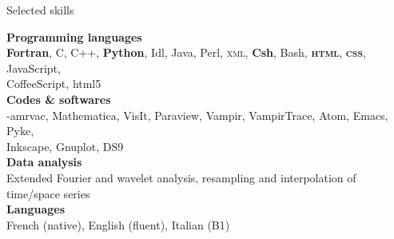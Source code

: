 \documentclass[a4paper,oneside]{cv}
\begin{document}
\begin{rubrique}{Selected skills}
~

\textbf{Programming languages}\\
\hspace*{1cm}\textbf{Fortran}, C, C++, \textbf{Python}, Idl, Java, Perl, \textsc{xml}, \textbf{Csh}, Bash, \textbf{\textsc{html}}, \textbf{\textsc{css}}, JavaScript, \\
\hspace*{1cm}CoffeeScript, {\sc html5}\\ 

\textbf{Codes \& softwares}\\
\hspace*{1cm}{\sc mpi}-{\sc amrvac}, Mathematica, VisIt, Paraview, Vampir, VampirTrace, Atom, Emacs, Pyke,\\
\hspace*{1cm}Inkscape, Gnuplot, DS9\\

\textbf{Data analysis}\\
\hspace*{1cm}Extended Fourier and wavelet analysis, resampling and interpolation of time/space series\\

\textbf{Languages}\\
\hspace*{1cm} French (native), English (fluent), Italian (B1)

\end{rubrique}

\newpage

\phantom{n}
\end{document}
